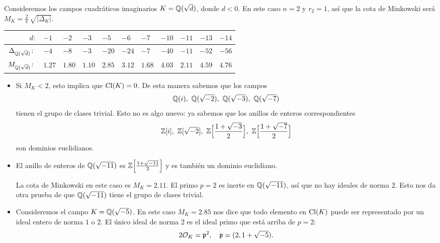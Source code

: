 \begin{ejemplo}
  Consideremos los campos cuadráticos imaginarios $K = \mathbb{Q} (\sqrt{d})$, donde
  $d < 0$. En este caso $n = 2$ y $r_2 = 1$, así que la cota de Minkowski será
  $M_K = \frac{2}{\pi}\,\sqrt{|\Delta_K|}$.

  \begin{center}\renewcommand{\arraystretch}{1.5}
    \begin{tabular}{rx{1cm}x{1cm}x{1cm}x{1cm}x{1cm}x{1cm}x{1cm}x{1cm}x{1cm}x{1cm}}
      \hline
      $d\colon$ & $-1$ & $-2$ & $-3$ & $-5$ & $-6$ & $-7$ & $-10$ & $-11$ & $-13$ & $-14$ \tabularnewline
      \hline
      $\Delta_{\mathbb{Q} (\sqrt{d})}\colon$ & $-4$ & $-8$ & $-3$ & $-20$ & $-24$ & $-7$ & $-40$ & $-11$ & $-52$ & $-56$ \tabularnewline
      \hline
      $M_{\mathbb{Q} (\sqrt{d})}\colon$ & $1.27$ & $1.80$ & $1.10$ & $2.85$ & $3.12$ & $1.68$ & $4.03$ & $2.11$ & $4.59$ & $4.76$ \tabularnewline
      \hline
    \end{tabular}
  \end{center}

  \vspace{1em}

  \begin{itemize}
  \item Si $M_K < 2$, esto implica que $\operatorname{Cl} (K) = 0$. De esta manera sabemos que
    los campos
    $$\mathbb{Q} (i), ~ \mathbb{Q} (\sqrt{-2}), ~ \mathbb{Q} (\sqrt{-3}), ~ \mathbb{Q} (\sqrt{-7})$$
    tienen el grupo de clases trivial. Esto no es algo nuevo: ya sabemos que los
    anillos de enteros correspondientes
    \[ \mathbb{Z} [i], ~
       \mathbb{Z} [\sqrt{-2}], ~
       \mathbb{Z} \Bigl[\frac{1+\sqrt{-3}}{2}\Bigr], ~
       \mathbb{Z} \Bigl[\frac{1+\sqrt{-7}}{2}\Bigr] \]
    son dominios euclidianos.

  \item El anillo de enteros de $\mathbb{Q} (\sqrt{-11})$ es
    $\mathbb{Z} \Bigl[\frac{1+\sqrt{-11}}{2}\Bigr]$ y es también un dominio euclidiano.

    La cota de Minkowski en este caso es $M_K = 2.11$. El primo $p = 2$ es
    inerte en $\mathbb{Q} (\sqrt{-11})$, así que no hay ideales de norma $2$. Esto nos
    da otra prueba de que $\mathbb{Q} (\sqrt{-11})$ tiene el grupo de clases trivial.

  \item Consideremos el campo $K = \mathbb{Q} (\sqrt{-5})$. En este caso $M_K = 2.85$
    nos dice que todo elemento en $\operatorname{Cl} (K)$ puede ser representado por un ideal
    entero de norma $1$ o $2$. El único ideal de norma $2$ es el ideal primo que
    está arriba de $p = 2$:
    $$2\mathcal{O}_K = \mathfrak{p}^2, \quad \mathfrak{p} = (2, 1 + \sqrt{-5}).$$


\end{itemize}
\end{ejemplo}
